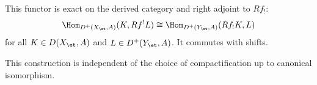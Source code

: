 \begin{definition}
    This functor is exact on the derived category and right adjoint to $Rf_!$:
    $$\Hom_{D^+(X_{\et}, A)}(K, Rf^! L) \cong \Hom_{D^+(Y_{\et}, A)}(Rf_! K, L)$$
    for all $K \in D(X_{\et}, A)$ and $L \in D^+(Y_{\et}, A)$. It commutes with shifts.

    This construction is independent of the choice of compactification up to canonical isomorphism.
\end{definition}